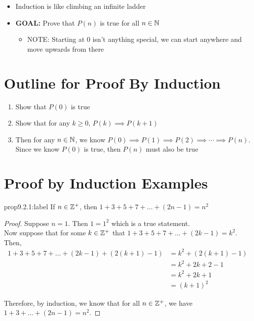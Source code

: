 \begin{itemize}
    \item Induction is like climbing an infinite ladder
    \item \textbf{GOAL:} Prove that $P(n)$ is true for all $n\in\mathbb{N}$
    \begin{itemize}
        \item NOTE: Starting at 0 isn't anything special, we can start anywhere and move upwards from there
    \end{itemize}
\end{itemize}

\section{Outline for Proof By Induction}

\begin{enumerate}
    \item Show that $P(0)$ is true
    \item Show that for any $k \ge 0$, $P(k) \implies P(k+1)$
    \item Then for any $n\in\mathbb{N}$, we know $P(0) \implies P(1) \implies P(2) \implies \cdots \implies P(n)$. Since we know $P(0)$ is true, then $P(n)$ must also be true
\end{enumerate}

\section{Proof by Induction Examples}

\begin{proposition}{prop9.2.1:label}
    If $n\in\mathbb{Z}^+$, then $1+3+5+7+...+(2n-1)=n^2$
\end{proposition}

\begin{proof}
    Suppose $n=1$. Then $1=1^2$ which is a true statement. \\

    Now suppose that for some $k\in\mathbb{Z}^+$ that $1+3+5+7+...+(2k-1) = k^2$. Then, 
    \[
    \begin{aligned}
        1+3+5+7+...+(2k-1)+(2(k+1)-1) &= k^2 + (2(k+1)-1)\\
        &= k^2 + 2k + 2 - 1\\
        &= k^2+2k+1\\
        &= (k+1)^2
    \end{aligned}    
    \]
    
    Therefore, by induction, we know that for all $n\in\mathbb{Z}^+$, we have $1+3+...+(2n-1)=n^2$.
\end{proof}

